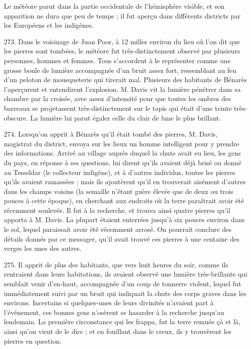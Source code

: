 \documentclass[a4paper, 11pt, oneside, polutonikogreek, french]{article}
\begin{document}
Le météore parut dans la partie occidentale de l'hémisphère visible, et son apparition ne dura que peu de temps ; il fut aperçu dans différents districts par les Européens et les indigènes.

273. Dans le voisinage de Juan Poor, à 12 milles environ du lieu où l'on dit que les pierres sont tombées, le météore fut très-distinctement observé par plusieurs personnes, hommes et femmes. Tous s'accordent à le représenter comme une grosse boule de lumière accompagnée d'un bruit assez fort, ressemblant au feu d'un peloton de mousqueterie qui tirerait mal. Plusieurs des habitants de Bénarès l'aperçurent et entendirent l'explosion. M. Davis vit la lumière pénétrer dans sa chambre par la croisée, avec assez d'intensité pour que toutes les ombres des barreaux se projetassent très-distinctement sur le tapis qui était d'une teinte très-obscure. La lumière lui parut égaler celle du clair de lune le plus brillant.

274. Lorsqu'on apprit à Bénarès qu'il était tombé des pierres, M. Davis, magistrat du district, envoya sur les lieux un homme intelligent pour y prendre des informations. Arrivé au village auprès duquel la chute avait eu lieu, les gens du pays, en réponse à ses questions, lui dirent qu'ils avaient déjà brisé ou donné au Tesseldar (le collecteur indigène), et à d'autres individus, toutes les pierres qu'ils avaient ramassées ; mais ils ajoutèrent qu'il en trouverait aisément d'autres dans les champs voisins (la semaille n'étant guère élevée que de deux ou trois pouces à cette époque), en cherchant aux endroits où la terre paraîtrait avoir été récemment soulevée. Il fut à la recherche, et trouva ainsi quatre pierres qu'il apporta à M. Davis. La plupart étaient enterrées jusqu'à six pouces environ dans le sol, lequel paraissait avoir été récemment arrosé. On pourrait conclure des détails donnés par ce messager, qu'il avait trouvé ces pierres à une centaine des verges les unes des autres.

275. Il apprit de plus des habitants, que vers huit heures du soir, comme ils rentraient dans leurs habitations, ils avaient observé une lumière très-brillante qui semblait venir d'en-haut, accompagnée d'un coup de tonnerre violent, lequel fut immédiatement suivi par un bruit qui indiquait la chute des corps graves dans les environs. Incertains si quelques-unes de leurs divinités n'avaient part à l'événement, ces bonnes gens n'osèrent se hasarder à la recherche jusqu'au lendemain. La première circonstance qui les frappa, fut la terre remuée çà et là, ainsi qu'on vient de le dire ; et en fouillant dans le creux, ils y trouvèrent les pierres en question.
\end{document}
